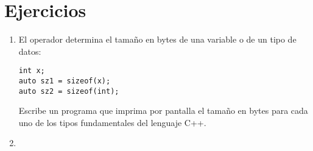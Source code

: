 \section{Ejercicios}

\begin{enumerate}

\item El operador  determina el tamaño en bytes de una variable o de
un tipo de datos:

\begin{lstlisting}
int x;
auto sz1 = sizeof(x);
auto sz2 = sizeof(int);
\end{lstlisting}

Escribe un programa que imprima por pantalla el tamaño en bytes para cada uno de los
tipos fundamentales del lenguaje C++.

\item {}

\end{enumerate}
